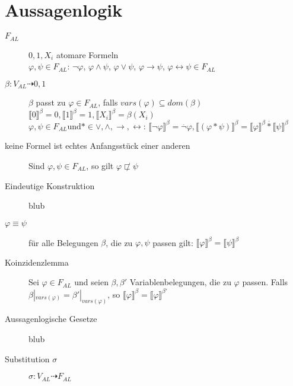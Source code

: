 \documentclass[12pt,a4paper]{scrartcl}
\author{Johannes Hedtrich}
\date{\today}
\begin{document}
  \section{Aussagenlogik}
  \begin{description}
    \item[$F_{AL}$] $0,1,X_i$ atomare Formeln\\
            $\varphi, \psi \in F_{AL}$: $\neg \varphi$, $\varphi \wedge \psi$, $\varphi \vee \psi$, $\varphi \rightarrow \psi$, $\varphi \leftrightarrow \psi \in F_{AL}$
    \item[$\beta: V_{AL} \dashrightarrow {0,1}$] $\beta$ passt zu $\varphi \in F_{AL}$, falls $vars(\varphi) \subseteq dom(\beta)$\\
            $\llbracket 0 \rrbracket^{\beta} = 0, \llbracket 1 \rrbracket^{\beta} = 1, \llbracket X_i \rrbracket^{\beta} = \beta(X_i)$\\
            $\varphi, \psi \in F_{AL} \text{und} * \in {\vee, \wedge, \rightarrow, \leftrightarrow} $: $\llbracket \neg \varphi \rrbracket^{\beta} = \overset{.}{\neg} \varphi, \llbracket(\varphi * \psi)\rrbracket^{\beta} = \llbracket \varphi \rrbracket^{\beta} \overset{.}{*} \llbracket \psi \rrbracket^{\beta}$
    \item[keine Formel ist echtes Anfangsstück einer anderen] Sind $\varphi, \psi \in F_{AL}$, so gilt $\varphi \not \sqsubset \psi$
    \item[Eindeutige Konstruktion] blub
    \item[$\varphi \equiv \psi$] für alle Belegungen $\beta$, die zu $\varphi, \psi$ passen gilt: $\llbracket \varphi \rrbracket^{\beta} = \llbracket \psi \rrbracket^{\beta}$
    \item[Koinzidenzlemma] Sei $\varphi \in F_{AL}$ und seien $\beta, \beta'$ Variablenbelegungen, die zu $\varphi$ passen. Falls $\beta|_{vars(\varphi)} = \beta'|_{vars(\varphi)}$, so $\llbracket \varphi \rrbracket^{\beta} = \llbracket \varphi \rrbracket^{\beta'}$
    \item[Aussagenlogische Gesetze] blub
    \item[Substitution $\sigma$] $\sigma: V_{AL} \dashrightarrow F_{AL}$
  \end{description}
\end{document}
